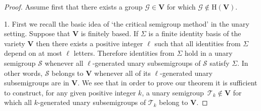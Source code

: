 \documentclass[11pt,reqno]{amsart}
\numberwithin{equation}{section}
\theoremstyle{remark}
\def\Vc{\mathbf{V}}
\def\Si{\Sigma}
\def\H{\mathrm H}
\def\sm{semi\-group}
\def\fb{finitely based}
\begin{document}
\begin{proof}
Assume first that there exists a group $\mathcal{G}\in\Vc$ for
which $\mathcal{G}\notin\H(\Vc)$.

\medskip

1. First we recall the basic idea of `the critical semigroup
method' in the unary setting. Suppose that ${\Vc}$ is \fb. If
$\Si$ is a finite identity basis of the variety ${\Vc}$ then there
exists a positive integer $\ell$ such that all identities from
$\Si$ depend on at most $\ell$ letters. Therefore identities from
$\Si$ hold in a unary semigroup $\mathcal{S}$ whenever all
$\ell$-generated unary subsemigroups of $\mathcal{S}$ satisfy
$\Si$. In other words, $\mathcal{S}$ belongs to $\Vc$ whenever all
of its $\ell$-generated unary subsemigroups are in ${\Vc}$. We see
that in order to prove our theorem it is sufficient to construct,
for any given positive integer $k$, a unary \sm\
$\mathcal{T}_k\notin{\Vc}$ for which all $k$-generated unary
sub\sm s of $\mathcal{T}_k$ belong to ${\Vc}$.

\medskip


\end{proof}
\end{document}
